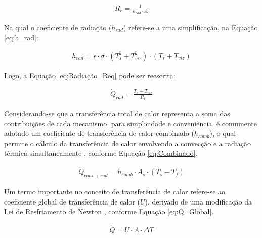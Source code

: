\documentclass[acronym,symbols,table]{fei}
\begin{document}
\begin{equation} \label{eq:Rradiação_R}
\begin{aligned}
    {R}_{r}=\frac{1}{h_{rad} \cdot A}
\end{aligned}
\end{equation}

Na qual o coeficiente de radiação ($h_{rad}$) refere-se a uma simplificação, na Equação \ref{eq:h_rad}:

\begin{equation} \label{eq:h_rad}
\begin{aligned}
    {h}_{rad}=\epsilon \cdot \sigma \cdot (T_{s}^2+T_{viz}^2) \cdot (T_{s}+T_{viz})
\end{aligned}
\end{equation}

Logo, a Equação \ref{eq:Radiação_Req} pode ser reescrita:

\begin{equation} \label{eq:Radiação_Req}
\begin{aligned}
    \dot{Q}_{rad}=\frac {T_{s}-T_{viz}}{{R}_{r}}
\end{aligned}
\end{equation}

Considerando-se que a transferência total de calor representa a soma das contribuições de cada mecanismo, para simplicidade e conveniência, é comumente adotado um coeficiente de transferência de calor combinado ($h_{comb}$), o qual permite o cálculo da transferência de calor envolvendo a convecção e a radiação térmica simultaneamente \cite{yunus2003heat}, conforme Equação \ref{eq:Combinado}.

\begin{equation} \label{eq:Combinado}
\begin{aligned}
    \dot{Q}_{conv+rad}=h_{comb} \cdot A_{s} \cdot (T_{s}-T_{f})
\end{aligned}
\end{equation}

Um termo importante no conceito de transferência de calor refere-se ao coeficiente global de transferência de calor ($\overline{U}$), derivado de uma modificação da Lei de Resfriamento de Newton \cite{kreith1999mechanical}, conforme Equação \ref{eq:Q_Global}.

\begin{equation} \label{eq:Q_Global}
\begin{aligned}
    \dot{Q}=\overline{U} \cdot A \cdot \Delta T
\end{aligned}
\end{equation}
\end{document}

